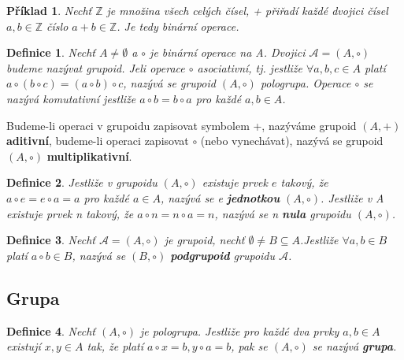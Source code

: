 \documentclass[12pt,a4paper]{article}
\newtheorem{definition}{Definice}
\newtheorem{example}{Příklad}
\begin{document}
\begin{example}
	Nechť $\mathbb{Z}$ je množina všech celých čísel, + přiřadí každé dvojici čísel $a,b \in \mathbb{Z}$ číslo $a + b \in \mathbb{Z}$. Je tedy binární operace.
\end{example}

\begin{definition}
	Nechť $A \not= \emptyset$ a $\circ$ je binární operace na A. Dvojici $\mathscr{A} = (A, \circ)$ budeme nazývat grupoid. Jeli operace $\circ$ asociativní, tj. jestliže $\forall a,b,c \in A$ platí $a \circ (b \circ c) = (a \circ b) \circ c$, nazývá se grupoid $(A, \circ)$ pologrupa. Operace $\circ$ se nazývá komutativní jestliže $a \circ b = b \circ a$ pro každé $a,b \in A$.
\end{definition}

Budeme-li operaci v grupoidu zapisovat symbolem +, nazýváme grupoid $(A, +)$ \textbf{aditivní}, budeme-li operaci zapisovat $\circ$ (nebo vynechávat), nazývá se grupoid $(A, \circ)$ \textbf{multiplikativní}.

\begin{definition}
	Jestliže v grupoidu $(A, \circ)$ existuje prvek $e$ takový, že $a \circ e = e \circ a = a$ pro každé $a \in A$, nazývá se e \textbf{jednotkou} $(A, \circ)$. Jestliže v A existuje prvek n takový, že $a \circ n = n \circ a = n$, nazývá se n \textbf{nula} grupoidu $(A, \circ)$.
\end{definition}

\begin{definition}
	Nechť $\mathscr{A} = (A, \circ)$ je grupoid, nechť $\emptyset \not= B \subseteq A$.Jestliže $\forall a,b \in B$ platí $a \circ b \in B$, nazývá se $(B, \circ)$ \textbf{podgrupoid} grupoidu $\mathscr{A}$.
\end{definition}

\subsection{Grupa}
\begin{definition}
	Nechť $(A, \circ)$ je pologrupa. Jestliže pro každé dva prvky $a,b \in A$ existují $x,y \in A$ tak, že platí  $a \circ x = b, y \circ a = b$, pak se $(A, \circ)$ se nazývá \textbf{grupa}.
\end{definition}
\end{document}
